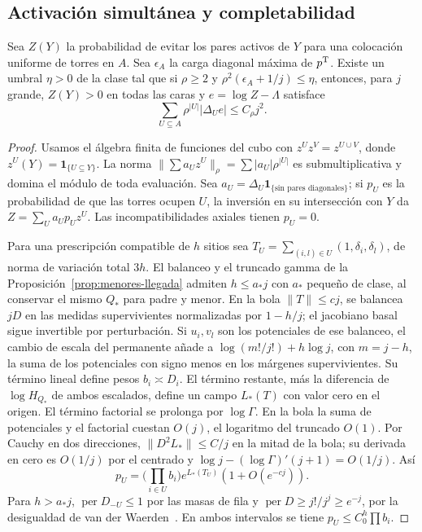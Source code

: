 \subsection{Activación simultánea y completabilidad}
\begin{proposicion}\label{prop:norma-llegada}
Sea \(Z(Y)\) la probabilidad de evitar los pares activos de \(Y\) para una colocación
uniforme de torres en \(A\). Sea \(\epsilon_A\) la carga diagonal máxima de \(p^{\rm T}\).
Existe un umbral \(\eta>0\) de la clase tal que si \(\rho\ge2\) y
\(\rho^2(\epsilon_A+1/j)\le\eta\), entonces, para \(j\) grande, \(Z(Y)>0\) en todas
las caras y \(e=\log Z-\Lambda\) satisface
\[
 \sum_{U\subseteq A}\rho^{|U|}|\Delta_Ue|\le C_\rho j^2.
\]
\end{proposicion}
\begin{proof}
Usamos el álgebra finita de funciones del cubo con \(z^Uz^V=z^{U\cup V}\), donde
\(z^U(Y)=\mathbf1_{\{U\subseteq Y\}}\). La norma \(\|\sum a_Uz^U\|_\rho
=\sum|a_U|\rho^{|U|}\) es submultiplicativa y domina el módulo de toda evaluación.
Sea \(a_U=\Delta_U\mathbf1_{\{\text{sin pares diagonales}\}}\); si \(p_U\) es la
probabilidad de que las torres ocupen \(U\), la inversión en su intersección con \(Y\)
da \(Z=\sum_Ua_Up_U z^U\). Las incompatibilidades axiales tienen \(p_U=0\).

Para una prescripción compatible de \(h\) sitios sea
\(T_U=\sum_{(i,l)\in U}(1,\delta_i,\delta_l)\), de norma de variación total \(3h\).
El balanceo y el truncado gamma de la Proposición~\ref{prop:menores-llegada} admiten
\(h\le a_*j\) con \(a_*\) pequeño de clase, al conservar el mismo \(Q_*\) para padre y
menor. En la bola \(\|T\|\le c j\), se balancea \(jD\) en las medidas supervivientes
normalizadas por \(1-h/j\); el jacobiano basal sigue invertible por perturbación.
Si \(u_i,v_l\) son los potenciales de ese balanceo, el cambio de escala del permanente
añade a \(\log(m!/j!)+h\log j\), con \(m=j-h\), la suma de los potenciales con signo
menos en los márgenes supervivientes. Su término lineal define pesos \(b_i\asymp D_i\).
El término restante, más la diferencia de \(\log H_{Q_*}\) de ambos escalados, define
un campo \(L_*(T)\) con valor cero en el origen. El término factorial se prolonga por
\(\log\Gamma\). En la bola la suma de potenciales y el factorial cuestan \(O(j)\), el
logaritmo del truncado \(O(1)\). Por Cauchy en dos direcciones,
\(\|D^2L_*\|\le C/j\) en la mitad de la bola; su derivada en cero es \(O(1/j)\) por
el centrado y \(\log j-(\log\Gamma)'(j+1)=O(1/j)\). Así
\[
 p_U=\Big(\prod_{i\in U}b_i\Big)e^{L_*(T_U)}(1+O(e^{-cj})).
\]
Para \(h>a_*j\), \(\operatorname{per}D_{-U}\le1\) por las masas de fila y
\(\operatorname{per}D\ge j!/j^j\ge e^{-j}\), por la desigualdad de van der
Waerden~\cite{egorychev,falikman}.
En ambos intervalos se tiene \(p_U\le C_0^h\prod b_i\).


\end{proof}
